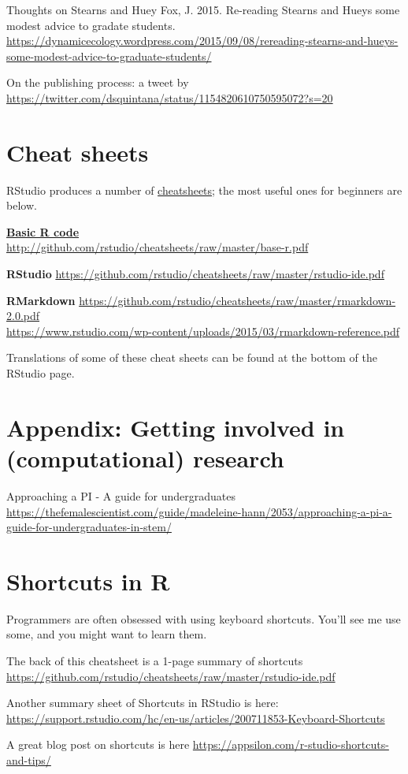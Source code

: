\documentclass[
]{book}
\begin{document}
Thoughts on Stearns and Huey
Fox, J. 2015. Re-reading Stearns and Hueys some modest advice to gradate students.
\url{https://dynamicecology.wordpress.com/2015/09/08/rereading-stearns-and-hueys-some-modest-advice-to-graduate-students/}

On the publishing process: a tweet by \citet{dsquintana}
\url{https://twitter.com/dsquintana/status/1154820610750595072?s=20}

\hypertarget{cheat-sheets}{%
\chapter{Cheat sheets}\label{cheat-sheets}}

RStudio produces a number of \href{https://www.rstudio.com/resources/cheatsheets/\#ide}{cheatsheets}; the most useful ones for beginners are below.

\href{http://github.com/rstudio/cheatsheets/raw/master/base-r.pdf}{\textbf{Basic R code}}\\
\url{http://github.com/rstudio/cheatsheets/raw/master/base-r.pdf}

\textbf{RStudio}
\url{https://github.com/rstudio/cheatsheets/raw/master/rstudio-ide.pdf}

\textbf{RMarkdown}
\url{https://github.com/rstudio/cheatsheets/raw/master/rmarkdown-2.0.pdf}\\
\url{https://www.rstudio.com/wp-content/uploads/2015/03/rmarkdown-reference.pdf}

Translations of some of these cheat sheets can be found at the bottom of the RStudio page.

\hypertarget{appendix-getting-involved-in-computational-research}{%
\chapter{Appendix: Getting involved in (computational) research}\label{appendix-getting-involved-in-computational-research}}

Approaching a PI - A guide for undergraduates \url{https://thefemalescientist.com/guide/madeleine-hann/2053/approaching-a-pi-a-guide-for-undergraduates-in-stem/}

\hypertarget{shortcuts-in-r}{%
\chapter{Shortcuts in R}\label{shortcuts-in-r}}

Programmers are often obsessed with using keyboard shortcuts. You'll see me use some, and you might want to learn them.

The back of this cheatsheet is a 1-page summary of shortcuts
\url{https://github.com/rstudio/cheatsheets/raw/master/rstudio-ide.pdf}

Another summary sheet of Shortcuts in RStudio is here:
\url{https://support.rstudio.com/hc/en-us/articles/200711853-Keyboard-Shortcuts}

A great blog post on shortcuts is here
\url{https://appsilon.com/r-studio-shortcuts-and-tips/}
\end{document}
